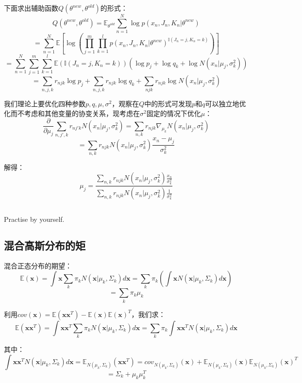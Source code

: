 \documentclass[UTF8]{ctexart}
\begin{document}
下面求出辅助函数$Q(\theta^{new},\theta^{old})$的形式：
$$Q(\theta^{new},\theta^{old})=\mathbb{E}_{\theta^{old}}\sum_{n=1}^{N}\log p(x_{n},J_{n},K_{n}|\theta^{new})$$
$$=\sum_{n=1}^{N}\mathbb{E}[\log(\prod_{j=1}^{m}\prod_{k=1}^{l} p(x_{n},J_{n},K_{n}|\theta^{new})^{\mathbb{I}(J_{n}=j,K_{n}=k)} )]$$
$$=\sum_{n=1}^{N}\sum_{j=1}^{m}\sum_{k=1}^{l}\mathbb{E}(\mathbb{I}(J_{n}=j,K_{n}=k))(\log p_{j} + \log q_{k} + \log N(x_{n}|\mu_{j},\sigma^{2}_{k}))$$
$$=\sum_{n,j,k}r_{njk}\log p_{j} + \sum_{n,j,k}r_{njk}\log q_{k} + \sum_{njk}r_{njk}\log N(x_{n}|\mu_{j},\sigma^{2}_{k})$$

我们理论上要优化四种参数$p,q,\mu,\sigma^{2}$，观察在$Q$中的形式可发现$p$和$q$可以独立地优化而不考虑和其他变量的协变关系，现考虑在$\sigma^{2}$固定的情况下优化$\mu$：
$$\frac{\partial}{\partial \mu_{j}}\sum_{n,j',k}r_{nj'k}N(x_{n}|\mu_{j},\sigma^{2}_{k})=\sum_{n,k}r_{njk}\nabla_{\mu_{k}}N(x_{n}|\mu_{j},\sigma^{2}_{k})$$
$$=\sum_{n,k}r_{njk}N(x_{n}|\mu_{j},\sigma^{2}_{k})\frac{x_{n}-\mu_{j}}{\sigma^{2}_{k}}$$

解得：
$$\mu_{j}=\frac{\sum_{n,k}r_{njk}N(x_{n}|\mu_{j},\sigma^{2}_{k})\frac{x_{n}}{\sigma^{2}_{k}}} { \sum_{n,k}r_{njk}N(x_{n}|\mu_{j},\sigma^{2}_{k})\frac{1}{\sigma^{2}_{k}}}$$

\subsection{}
Practise by yourself.

\subsection{混合高斯分布的矩}
混合正态分布的期望：
$$\mathbb{E}(\textbf{x})=\int\textbf{x}\sum_{k}\pi_{k}N(\textbf{x}|\mu_{k},\Sigma_{k})d\textbf{x}=\sum_{k}\pi_{k}(\int\textbf{x}N(\textbf{x}|\mu_{k},\Sigma_{k})d\textbf{x})$$
$$=\sum_{k}\pi_{k}\mu_{k}$$

利用$cov(\textbf{x})=\mathbb{E}(\textbf{x}\textbf{x}^{T})-\mathbb{E}(\textbf{x})\mathbb{E}(\textbf{x})^{T}$，我们求：
$$\mathbb{E}(\textbf{x}\textbf{x}^{T})=\int \textbf{x}\textbf{x}^{T}\sum_{k}\pi_{k}N(\textbf{x}|\mu_{k},\Sigma_{k})d\textbf{x}=\sum_{k}\pi_{k}\int \textbf{x}\textbf{x}^{T}N(\textbf{x}|\mu_{k},\Sigma_{k})d\textbf{x}$$

其中：
$$\int \textbf{x}\textbf{x}^{T}N(\textbf{x}|\mu_{k},\Sigma_{k})d\textbf{x}=\mathbb{E}_{N(\mu_{k},\Sigma_{k})}(\textbf{x}\textbf{x}^{T})=cov_{N(\mu_{k},\Sigma_{k})}(\textbf{x})+\mathbb{E}_{N(\mu_{k},\Sigma_{k})}(\textbf{x})\mathbb{E}_{N(\mu_{k},\Sigma_{k})}(\textbf{x})^{T}$$
$$=\Sigma_{k}+\mu_{k}\mu_{k}^{T}$$
\end{document}
